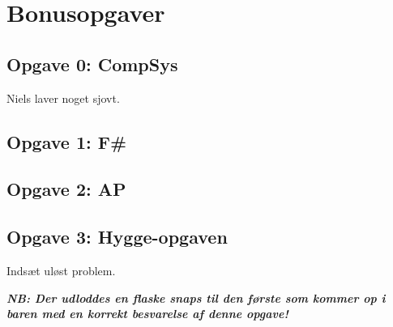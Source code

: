 \section{\huge{Bonusopgaver}}

\subsection{Opgave 0: CompSys}

Niels laver noget sjovt.


\subsection{Opgave 1: F\#}



\subsection{Opgave 2: AP}



\subsection{Opgave 3: Hygge-opgaven}

Indsæt uløst problem.

\vspace{.1in} \textbf{\emph{NB: Der udloddes en flaske snaps til den første som
kommer op i baren med en korrekt besvarelse af denne opgave!}}

\setlength{\parindent}{0mm}
